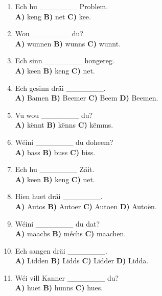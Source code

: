 \begin{enumerate}
    \item Ech hu \_\_\_\_\_\_\_ Problem. \\
    \textbf{A)} keng \quad \textbf{B)} net \quad \textbf{C)} kee.
    
    \item Wou \_\_\_\_\_\_\_ du? \\
    \textbf{A)} wunnen \quad \textbf{B)} wunns \quad \textbf{C)} wunnt.
    
    \item Ech sinn \_\_\_\_\_\_\_ hongereg. \\
    \textbf{A)} keen \quad \textbf{B)} keng \quad \textbf{C)} net.
    
    \item Ech gesinn dräi \_\_\_\_\_\_\_. \\
    \textbf{A)} Bamen \quad \textbf{B)} Beemer \quad \textbf{C)} Beem \quad \textbf{D)} Beemen.
    
    \item Vu wou \_\_\_\_\_\_\_ du? \\
    \textbf{A)} kënnt \quad \textbf{B)} kënns \quad \textbf{C)} këmms.
    
    \item Wéini \_\_\_\_\_\_\_ du doheem? \\
    \textbf{A)} bass \quad \textbf{B)} buss \quad \textbf{C)} biss.
    
    \item Ech hu \_\_\_\_\_\_\_ Zäit. \\
    \textbf{A)} keen \quad \textbf{B)} keng \quad \textbf{C)} net.
    
    \item Hien huet dräi \_\_\_\_\_\_\_. \\
    \textbf{A)} Autos \quad \textbf{B)} Autoer \quad \textbf{C)} Autoen \quad \textbf{D)} Autoën.
    
    \item Wéini \_\_\_\_\_\_\_ du dat? \\
    \textbf{A)} maachs \quad \textbf{B)} méchs \quad \textbf{C)} maachen.
    
    \item Ech sangen dräi \_\_\_\_\_\_\_. \\
    \textbf{A)} Lidden \quad \textbf{B)} Lidds \quad \textbf{C)} Lidder \quad \textbf{D)} Lidda.
    
    \item Wéi vill Kanner \_\_\_\_\_\_\_ du? \\
    \textbf{A)} huet \quad \textbf{B)} hunns \quad \textbf{C)} hues.
    

\end{enumerate}
